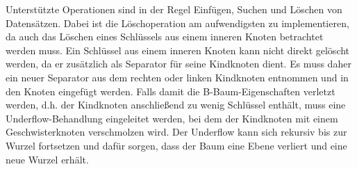 Unterstützte Operationen sind in der Regel Einfügen, Suchen und Löschen von Datensätzen. Dabei ist die Löschoperation am aufwendigsten zu implementieren, da auch das Löschen eines Schlüssels aus einem inneren Knoten betrachtet werden muss. Ein Schlüssel aus einem inneren Knoten kann nicht direkt gelöscht werden, da er zusätzlich als Separator für seine Kindknoten dient. Es muss daher ein neuer Separator aus dem rechten oder linken Kindknoten entnommen und in den Knoten eingefügt werden. Falls damit die B-Baum-Eigenschaften verletzt werden, d.h. der Kindknoten anschließend zu wenig Schlüssel enthält, muss eine Underflow-Behandlung eingeleitet werden, bei dem der Kindknoten mit einem Geschwisterknoten verschmolzen wird. Der Underflow kann sich rekursiv bis zur Wurzel fortsetzen und dafür sorgen, dass der Baum eine Ebene verliert und eine neue Wurzel erhält. 
